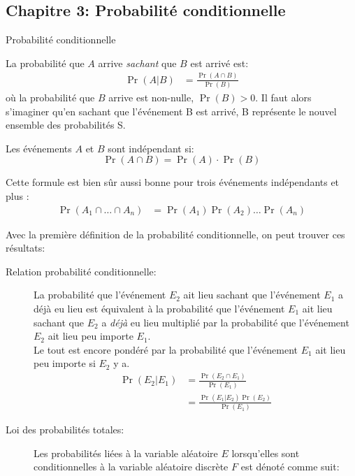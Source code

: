 \documentclass[10pt, french]{article}
\begin{document}
\begin{multicols*}{3}
\section{Chapitre 3: Probabilité conditionnelle}
\begin{probch3}{Probabilité conditionnelle}
\begin{description}
	\item[Conditionnel:]	La probabilité que $A$ arrive \textit{sachant} que $B$ est arrivé est: 
	\begin{align*}
		\Pr(A | B) 
		&= 	\frac{\Pr(A \cap B)}{\Pr(B)}	
	\end{align*}
	où la probabilité que $B$ arrive est non-nulle, $\Pr(B) > 0$. Il faut alors s'imaginer qu'en sachant que l'événement B est arrivé, B représente le nouvel ensemble des probabilités S.
	\item[Indépendant:]	Les événements $A$ et $B$ sont indépendant si:
	\begin{equation*}
		\Pr(A \cap B) = \Pr(A) \cdot \Pr(B)
	\end{equation*}
	\item Cette formule est bien sûr aussi bonne pour trois événements indépendants et plus : 
	\setlength{\mathindent}{-1cm}
	\begin{align*}
	\Pr(A_{1} \cap \dots \cap A_{n}) 
	  &= \Pr(A_{1}) \Pr(A_{2}) \dots \Pr(A_{n})
	\end{align*}
\end{description}
Avec la première définition de la probabilité conditionnelle, on peut trouver ces résultats:
\begin{description}
	\item[Relation probabilité conditionnelle: ]	La probabilité que l'événement $E_{2}$ ait lieu sachant que l'événement $E_{1}$ a déjà eu lieu est équivalent à la probabilité que l'événement $E_{1}$ ait lieu sachant que $E_{2}$ a \textit{déjà} eu lieu multiplié par la probabilité que l'événement $E_{2}$ ait lieu peu importe $E_{1}$. \\
	Le tout est encore pondéré par la probabilité que l'événement $E_{1}$ ait lieu peu importe si $E_{2}$ y a.
	\begin{align*}
		\Pr(E_{2} | E_{1})
		&= 	\frac{\Pr(E_{2} \cap E_{1})}{\Pr(E_{1})}		\\
		&=	\frac{\Pr(E_{1} | E_{2}) \Pr(E_{2})}{\Pr(E_{1})}		
	\end{align*}
	\item[Loi des probabilités totales: ]	Les probabilités liées à la variable aléatoire $E$ lorsqu'elles sont conditionnelles à la variable aléatoire discrète $F$ est dénoté comme suit:

\end{description}
\end{probch3}
\end{multicols*}
\end{document}
